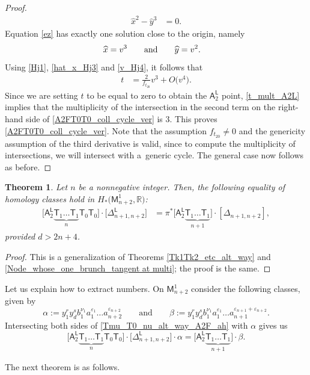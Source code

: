 \documentclass[pdftex]{sigma}
\numberwithin{equation}{section}
\newtheorem{thm}{Theorem}[section]
\begin{document}
\begin{proof}
\begin{align}
\widehat{x}^2 - \widehat{y}^3 &  =  0.
\end{align}
Equation \eqref{ez} has exactly one solution close to the origin, namely
\begin{align}
\widehat{x}&  =  v^3 \qquad \textnormal{and} \qquad \widehat{y}  =  v^2.\label{v_Hj4}
\end{align}
Using \eqref{Hj1}, \eqref{hat_x_Hj3} and \eqref{v_Hj4}, it follows that
\begin{align}
t &  =  \frac{2}{f_{t_{20}}} v^3 + O\bigl(v^4\bigr). \label{t_mult_A2L}
\end{align}
Since we are setting $t$ to be equal to zero to obtain the $\mathsf{A}_2^{\mathsf{L}}$ point,
\eqref{t_mult_A2L} implies that the multiplicity of the intersection in the second term on the
right-hand side of \eqref{A2FT0T0_coll_cycle_ver} is $3$. This proves \eqref{A2FT0T0_coll_cycle_ver}.
Note that the assumption $f_{t_{20}} \not= 0$ and the
genericity assumption of the third derivative is valid, since to compute the multiplicity of
intersections, we will intersect with a~generic cycle. The general case now follows as before.
\end{proof}

\begin{thm}
\label{Tk1Tk2_etc_alt_way_A2F_ah}
Let $n$ be a nonnegative integer.
Then, the following equality of homology classes hold in
$H_*\bigl(\mathsf{M}_{n+2}^1, \mathbb{R}\bigr)$:
\begin{align}
\bigl[\mathsf{A}_2^{\mathsf{L}} \underbrace{\mathsf{T}_{1} \dots \mathsf{T}_{1}}_{n} \mathsf{T}_{0} \mathsf{T}_0\bigr]
\cdot \bigl[\Delta_{{n+1}, {n+2}}^{\mathsf{L}}\bigr] &  =
\pi^{\ast}\bigl[\mathsf{A}_2^{\mathsf{L}} \underbrace{\mathsf{T}_{1} \dots\mathsf{T}_{1}}_{n+1}\bigr] \cdot
[\Delta_{n+1, n+2}], \label{Tmu_T0_nu_alt_way_A2F_ah}
\end{align}
provided $d > 2n+4$.
\end{thm}

\begin{proof} This is a generalization of Theorems \ref{Tk1Tk2_etc_alt_way} and
\ref{Node_whose_one_brunch_tangent at multi}; the proof is the same.
\end{proof}

\begin{rem} Let us explain how to extract numbers. On $\mathsf{M}^1_{n+2}$
consider the following classes, given by
\[\alpha := y_1^{r} y_d^{s}b_1^{\nu_1} a_1^{\varepsilon_1} \dots a_{n+2}^{\varepsilon_{n+2}}
\qquad \text{and} \qquad \beta := y_1^{r} y_d^{s}b_1^{\nu_1}
a_1^{\varepsilon_1} \dots a_{n+1}^{\varepsilon_{n+1} + \varepsilon_{n+2}}. \]
Intersecting both sides of \eqref{Tmu_T0_nu_alt_way_A2F_ah} with $\alpha$
gives us
\[
\bigl[\mathsf{A}_2^{\mathsf{L}} \underbrace{\mathsf{T}_{1} \dots \mathsf{T}_{1}}_{n} \mathsf{T}_{0} \mathsf{T}_0\bigr]
\cdot \bigl[\Delta_{{n+1}, {n+2}}^{\mathsf{L}}\bigr] \cdot \alpha  =
\bigl[\mathsf{A}_2^{\mathsf{L}} \underbrace{\mathsf{T}_{1} \dots\mathsf{T}_{1}}_{n+1}\bigr] \cdot \beta. \label{Tmu_T0_nu_alt_way_A2F_ah_Num}
\]
\end{rem}
 The next theorem is as follows.
\end{document}
